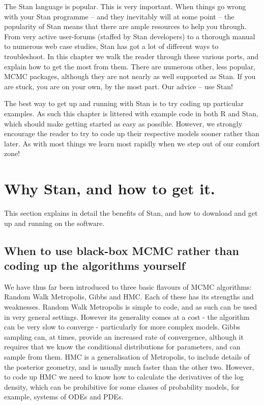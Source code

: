 \documentclass[11pt,fullpage]{book}
\begin{document}
The Stan language is popular. This is very important. When things go wrong with your Stan programme -- and they inevitably will at some point -- the popularity of Stan means that there are ample resources to help you through. From very active user-forums (staffed by Stan developers) to a thorough manual to numerous web case studies, Stan has got a lot of different ways to troubleshoot. In this chapter we walk the reader through these various ports, and explain how to get the most from them. There are numerous other, less popular, MCMC packages, although they are not nearly as well supported as Stan. If you are stuck, you are on your own, by the most part. Our advice -- use Stan!

The best way to get up and running with Stan is to try coding up particular examples. As such this chapter is littered with example code in both R and Stan, which should make getting started as easy as possible. However, we strongly encourage the reader to try to code up their respective models sooner rather than later. As with most things we learn most rapidly when we step out of our comfort zone!

\section{Why Stan, and how to get it.}
This section explains in detail the benefits of Stan, and how to download and get up and running on the software.

\subsection{When to use black-box MCMC rather than coding up the algorithms yourself}
We have thus far been introduced to three basic flavours of MCMC algorithms: Random Walk Metropolis, Gibbs and HMC. Each of these has its strengths and weaknesses. Random Walk Metropolis is simple to code, and as such can be used in very general settings. However its generality comes at a cost - the algorithm can be very slow to converge - particularly for more complex models. Gibbs sampling can, at times, provide an increased rate of convergence, although it requires that we know the conditional distributions for parameters, and can sample from them. HMC is a generalisation of Metropolis, to include details of the posterior geometry, and is usually much faster than the other two. However, to code up HMC we need to know how to calculate the derivatives of the log density, which can be prohibitive for some classes of probability models, for example, systems of ODEs and PDEs. 
\end{document}
